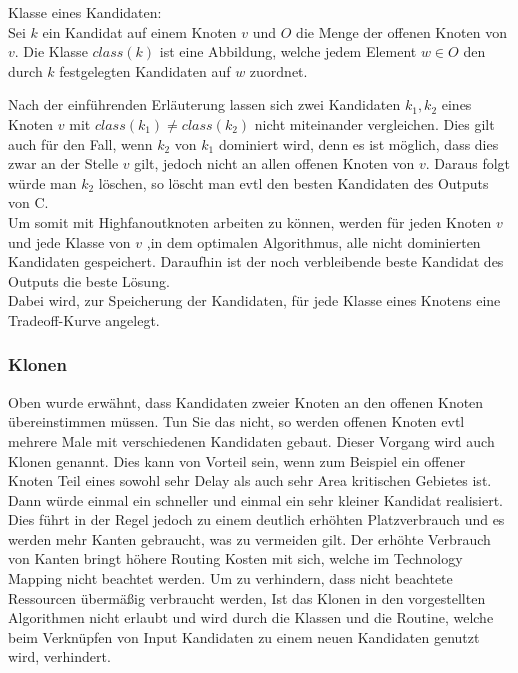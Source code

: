 \documentclass[11pt, a4paper, german]{article}
\newcommand{\TM}{Technology Mapping }
\begin{document}
\begin{definition}{Klasse eines Kandidaten:}\\
	Sei $k$ ein Kandidat auf einem Knoten $v$ und $O$ die Menge der offenen Knoten von $v$. Die Klasse $class(k)$ ist eine Abbildung, welche jedem Element $w \in O$ den durch $k$ festgelegten Kandidaten auf $w$ zuordnet.\\
\end{definition}
Nach der einführenden Erläuterung lassen sich zwei Kandidaten $k_1,k_2$ eines Knoten $v$ mit $class(k_1) \neq class(k_2)$ nicht miteinander vergleichen. Dies gilt auch für den Fall, wenn $k_2$ von  $k_1$ dominiert wird, denn es ist möglich, dass dies zwar an der Stelle $v$ gilt, jedoch nicht an allen offenen Knoten von $v$. Daraus folgt würde man $k_2$ löschen, so löscht man evtl den besten Kandidaten des Outputs von C. \\
Um somit mit Highfanoutknoten arbeiten zu können, werden für jeden Knoten $v$ und jede Klasse von $v$ ,in dem optimalen Algorithmus, alle nicht dominierten Kandidaten gespeichert. Daraufhin ist der noch verbleibende beste Kandidat des Outputs die beste Lösung.\\
Dabei wird, zur Speicherung der Kandidaten, für jede Klasse eines Knotens eine Tradeoff-Kurve angelegt.

\subsubsection{Klonen}
Oben wurde erwähnt, dass Kandidaten zweier Knoten an den offenen Knoten übereinstimmen müssen. Tun Sie das nicht, so werden offenen Knoten evtl mehrere Male mit verschiedenen Kandidaten gebaut. Dieser Vorgang wird auch Klonen genannt. Dies kann von Vorteil sein, wenn zum Beispiel ein offener Knoten Teil eines sowohl sehr Delay als auch sehr Area kritischen Gebietes ist. Dann würde einmal ein schneller und einmal ein sehr kleiner Kandidat realisiert. Dies führt in der Regel jedoch zu einem deutlich erhöhten Platzverbrauch und es werden mehr Kanten gebraucht, was zu vermeiden gilt. Der erhöhte Verbrauch von Kanten bringt höhere Routing Kosten mit sich, welche im \TM nicht beachtet werden. Um zu verhindern, dass nicht beachtete Ressourcen übermäßig verbraucht werden, Ist das Klonen in den vorgestellten Algorithmen nicht erlaubt und wird durch die Klassen und die Routine, welche beim Verknüpfen von Input Kandidaten zu einem neuen Kandidaten genutzt wird, verhindert. 
\end{document}
